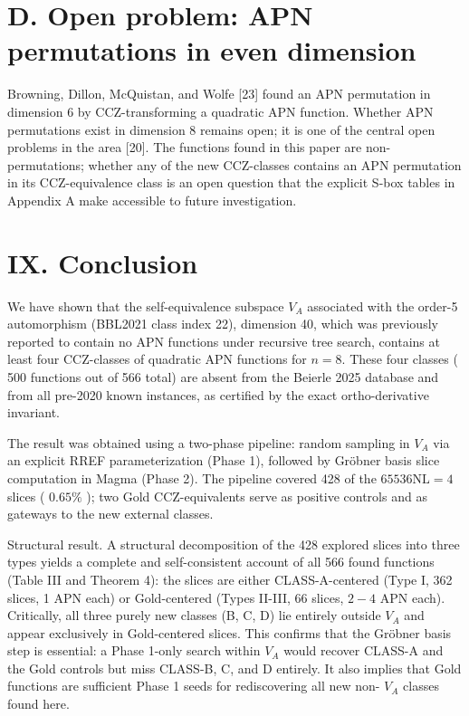 \documentclass[10pt]{article}
\begin{document}
\section*{D. Open problem: APN permutations in even dimension}
Browning, Dillon, McQuistan, and Wolfe [23] found an APN permutation in dimension 6 by CCZ-transforming a quadratic APN function. Whether APN permutations exist in dimension 8 remains open; it is one of the central open problems in the area [20]. The functions found in this paper are non-permutations; whether any of the new CCZ-classes contains an APN permutation in its CCZ-equivalence class is an open question that the explicit S-box tables in Appendix A make accessible to future investigation.

\section*{IX. Conclusion}
We have shown that the self-equivalence subspace $V_{A}$ associated with the order-5 automorphism (BBL2021 class index 22), dimension 40, which was previously reported to contain no APN functions under recursive tree search, contains at least four CCZ-classes of quadratic APN functions for $n=8$. These four classes ( 500 functions out of 566 total) are absent from the Beierle 2025 database and from all pre-2020 known instances, as certified by the exact ortho-derivative invariant.

The result was obtained using a two-phase pipeline: random sampling in $V_{A}$ via an explicit RREF parameterization (Phase 1), followed by Gröbner basis slice computation in Magma (Phase 2). The pipeline covered 428 of the $65536 \mathrm{NL}=4$ slices ( $0.65 \%$ ); two Gold CCZ-equivalents serve as positive controls and as gateways to the new external classes.

Structural result. A structural decomposition of the 428 explored slices into three types yields a complete and self-consistent account of all 566 found functions (Table III and Theorem 4): the slices are either CLASS-A-centered (Type I, 362 slices, 1 APN each) or Gold-centered (Types II-III, 66 slices, $2-4$ APN each). Critically, all three purely new classes (B, C, D) lie entirely outside $V_{A}$ and appear exclusively in Gold-centered slices. This confirms that the Gröbner basis step is essential: a Phase 1-only search within $V_{A}$ would recover CLASS-A and the Gold controls but miss CLASS-B, C, and D entirely. It also implies that Gold functions are sufficient Phase 1 seeds for rediscovering all new non- $V_{A}$ classes found here.
\end{document}
